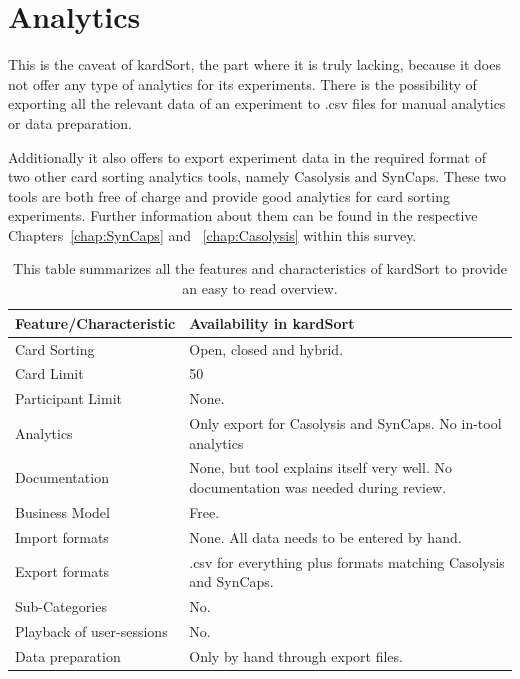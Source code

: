 \section{Analytics} This is the caveat of kardSort, the part where it
is truly lacking, because it does not offer any type of analytics for
its experiments. There is the  possibility of exporting all the
relevant data of an experiment to .csv files for manual analytics or
data preparation. 

Additionally it also offers to export experiment data in the required
format of two other card sorting analytics tools, namely Casolysis and
SynCaps. These two tools are both free of charge and provide good
analytics for card sorting experiments. Further information about them
can be found in the respective Chapters~\ref{chap:SynCaps} and
~\ref{chap:Casolysis} within this survey.

\begin{table}[tp]
\centering
\begin{tabularx}
{\linewidth}{|l|X|}
\hline \textbf{Feature/Characteristic} & \textbf{Availability in kardSort} \\ 
\hline Card Sorting & Open, closed and hybrid. \\ 
\hline Card Limit & 50 \\
\hline Participant Limit & None. \\
\hline Analytics & Only export for Casolysis and SynCaps. No in-tool
analytics \\ 
\hline Documentation & None, but tool explains itself very well. No 
documentation was needed during review. \\
\hline Business Model & Free. \\
\hline Import formats & None. All data needs to be entered by hand.\\ 
\hline Export formats & .csv for everything plus formats matching
Casolysis and SynCaps. \\ 
\hline Sub-Categories & No. \\ 
\hline Playback of user-sessions & No. \\ 
\hline Data preparation & Only by hand through export files. \\ 
\hline
\end{tabularx} 
\caption[Feature summary of kardSort] 
{ 
This table summarizes all the features and characteristics of kardSort
to provide an easy to read overview.
}
\label{tab:features-kardSort}
\end{table}


